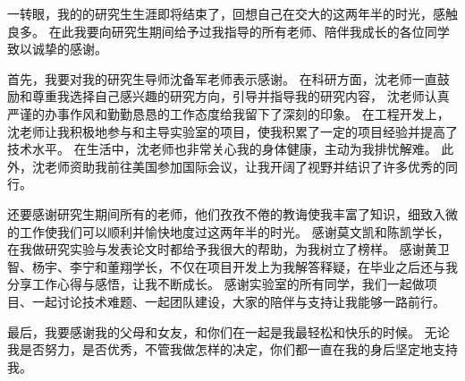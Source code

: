 \begin{thanks}



  
  
  

一转眼，我的的研究生生涯即将结束了，回想自己在交大的这两年半的时光，感触良多。
在此我要向研究生期间给予过我指导的所有老师、陪伴我成长的各位同学致以诚挚的感谢。

首先，我要对我的研究生导师沈备军老师表示感谢。
在科研方面，沈老师一直鼓励和尊重我选择自己感兴趣的研究方向，引导并指导我的研究内容，
沈老师认真严谨的办事作风和勤勤恳恳的工作态度给我留下了深刻的印象。
在工程开发上，沈老师让我积极地参与和主导实验室的项目，使我积累了一定的项目经验并提高了技术水平。
在生活中，沈老师也非常关心我的身体健康，主动为我排忧解难。
此外，沈老师资助我前往美国参加国际会议，让我开阔了视野并结识了许多优秀的同行。

还要感谢研究生期间所有的老师，他们孜孜不倦的教诲使我丰富了知识，细致入微的工作使我们可以顺利并愉快地度过这两年半的时光。
感谢莫文凯和陈凯学长，在我做研究实验与发表论文时都给予我很大的帮助，为我树立了榜样。
感谢黄卫智、杨宇、李宁和董翔学长，不仅在项目开发上为我解答释疑，在毕业之后还与我分享工作心得与感悟，让我不断成长。
感谢实验室的所有同学，我们一起做项目、一起讨论技术难题、一起团队建设，大家的陪伴与支持让我能够一路前行。

最后，我要感谢我的父母和女友，和你们在一起是我最轻松和快乐的时候。
无论我是否努力，是否优秀，不管我做怎样的决定，你们都一直在我的身后坚定地支持我。

\end{thanks}
